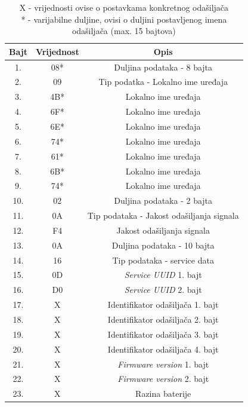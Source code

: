 \begin{table}[H]
    \centering
    \caption{Struktura \textit{scan response} paketa}
    \label{tbl:scanResponse}
    \small
    \begin{tabular}{ccc}
    \hline 
    Bajt & Vrijednost & Opis \\ 
    \hline 
    1. & 08* & Duljina podataka - 8 bajta \\ 
    2. & 09 & Tip podatka - Lokalno ime uređaja \\ 
    3. & 4B* & Lokalno ime uređaja \\ 
    4. & 6F* & Lokalno ime uređaja \\ 
    5. & 6E* & Lokalno ime uređaja \\ 
    6. & 74* & Lokalno ime uređaja \\ 
    7. & 61* & Lokalno ime uređaja \\ 
    8. & 6B* & Lokalno ime uređaja \\ 
    9. & 74* & Lokalno ime uređaja \\ 
    10. & 02 & Duljina podataka - 2 bajta \\ 
    11. & 0A & Tip podataka - Jakost odašiljanja signala \\ 
    12. & F4 & Jakost odašiljanja signala \\ 
    13. & 0A & Duljina podataka - 10 bajta \\ 
    14. & 16 & Tip podataka - service data \\ 
    15. & 0D & \textit{Service UUID} 1. bajt \\ 
    16. & D0 & \textit{Service UUID} 2. bajt \\ 
    17. & X & Identifikator odašiljača 1. bajt \\ 
    18. & X & Identifikator odašiljača 2. bajt \\ 
    19. & X & Identifikator odašiljača 3. bajt \\ 
    20. & X & Identifikator odašiljača 4. bajt \\ 
    21. & X & \textit{Firmware version} 1. bajt \\ 
    22. & X & \textit{Firmware version} 2. bajt \\ 
    23. & X & Razina baterije \\ 
    \hline
    \end{tabular}
    \caption*{
        X - vrijednosti ovise o postavkama konkretnog odašiljača \\
        * - varijabilne duljine, ovisi o duljini postavljenog imena odašiljača (max. 15 bajtova)
    } 
\end{table}